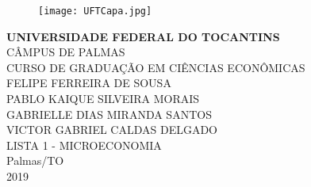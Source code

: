 \documentclass[a4paper, 12pt]{article}
\begin{document}
\pagestyle{plain}
\thispagestyle{empty}
\begin{figure}[H]
	\centering
	\texttt{[image: UFTCapa.jpg]}
\end{figure}

\begin{center}
	\textbf{UNIVERSIDADE FEDERAL DO TOCANTINS}\\[5pt]
	CÂMPUS DE PALMAS\\[5pt]
	CURSO DE GRADUAÇÃO EM CIÊNCIAS ECONÔMICAS\\[95pt]
	FELIPE FERREIRA DE SOUSA\\[3pt]
	PABLO KAIQUE SILVEIRA MORAIS\\[3pt]
	GABRIELLE DIAS MIRANDA SANTOS\\[3pt]
	VICTOR GABRIEL CALDAS DELGADO\\[170pt]
	LISTA 1 - MICROECONOMIA\\[140pt]
	Palmas/TO\\[5pt]
	2019\\
\end{center}
\end{document}
